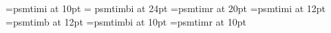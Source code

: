 


\font\tenBaskI=psmtimi at 10pt              %
\font\twentyfourBaskBI = psmtimbi at 24pt   %
\font\twentyBaskR=psmtimr at 20pt           %
\font\twelveBaskI=psmtimi at 12pt           %
\font\twelveBaskB=psmtimb at 12pt           %
\font\tenBaskBI=psmtimbi at 10pt            %
\font\tenBaskR=psmtimr at 10pt              %


\hsize=30pc
\vsize=53pc
\hoffset=1in
\footline{\hfill}
\def\leaderfill{\leaders\hbox to 5pt{\hss .\hss}\hfill}



\def\MakeHeader#1#2#3{
\centerline{\tenBaskI The Journal of}
\vskip 4pt
\centerline{\baselineskip=28pt \twentyfourBaskBI Economic Persepectives}
\vskip 8pt
\hrule width \hsize
\vskip 10pt
\line{{\twentyBaskR Contents}\hfil{\twelveBaskI Volume #1 $\bullet$ Number #2 $\bullet$ #3}}
\vskip 10pt
\hrule width \hsize}


\def\MajorHead#1{\vskip 20pt\line{\twelveBaskB #1 \hfil}}
\def\SymposiumTitle#1{\medskip\baselineskip=15pt\line{\tenBaskBI #1: \hfil}}
\def\Art#1#2#3{\line{\rm #1, ``#2'' \leaderfill #3 \par}}
\def\Dept#1#2{\line{\rm #1 \leaderfill #2 \par}}



